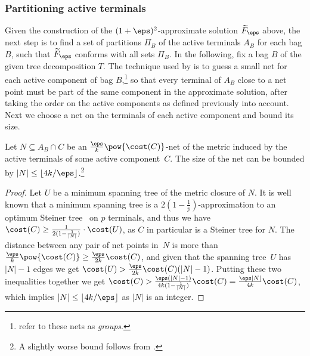 \subsubsection{Partitioning active terminals}
\label{sec:partitions}

Given the construction of the $(1+\eps)^2$-approximate solution $\widetilde{F}_\eps$ above, the next step is to find a set of partitions $\Pi_B$
of the active terminals $A_B$ for each bag $B$, such that $\widetilde{F}_\eps$ conforms with all sets $\Pi_B$.
In the following, fix a bag $B$ of the given tree decomposition $T$.
The technique used by \citet{bateni2011approximation} is to guess a small net for each active component of bag $B$,\footnote{\citet{bateni2011approximation} refer to these nets as \emph{groups}.}
so that every terminal of $A_B$ close to a net point must be part of the same component in the approximate solution, 
after taking the order on the active components as defined previously into account.
Next we choose a net on the terminals of each active component and bound its size.

\begin{lemma}\label{lem:nets}%
Let $N\subseteq A_B\cap C$ be an $\frac{\eps}{k}\pow{\cost(C)}$-net of the metric induced by 
the active terminals of some active component~$C$.
The size of the net can be bounded by $|N|\leq\lfloor 4k/\eps\rfloor$.\footnote{A slightly worse bound follows from \cite[Lemma~19]{bateni2011approximation}.}
\end{lemma}

%
\begin{proof}%
Let $U$ be a minimum spanning tree of the metric closure of $N$.
It is well known that a minimum spanning tree is a $2(1-\frac{1}{p})$-approximation to an optimum Steiner tree~\cite{KouMB81} on $p$ terminals, 
and thus we have $\cost(C)\geq\frac{1}{2(1-\frac{1}{|N|})}\cdot\cost(U)$, as $C$ in particular is a Steiner tree for $N$. The distance between any pair of 
net points in~$N$ is more than $\frac{\eps}{k}\pow{\cost(C)}\geq \frac{\eps}{2k}\cost(C)$, 
and given that the spanning tree~$U$ has $|N|-1$ edges we get $\cost(U)>\frac{\eps}{2k}\cost(C)(|N|-1)$. 
Putting these two inequalities together we get $\cost(C)>\frac{\eps(|N|-1)}{4k(1-\frac{1}{|N|})}\cost(C)=\frac{\eps|N|}{4k}\cost(C)$, which implies $|N|\leq\lfloor 4k/\eps\rfloor$ as $|N|$ is an integer.
\end{proof}
%

